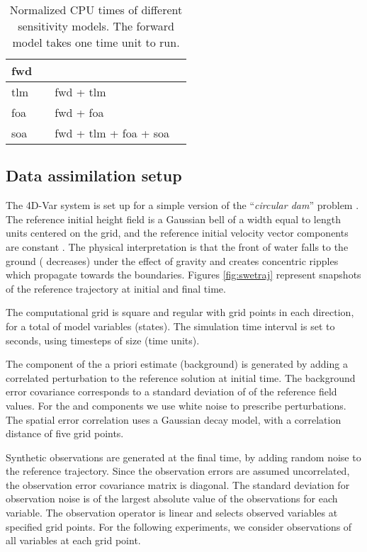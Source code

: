 \documentclass[final,sort&compress]{elsarticle}
\begin{document}
\begin{table}
\caption{Normalized CPU times of different sensitivity models. The forward model takes one time unit to run.}
\centering
\begin{tabular}{ll|ll}
\hline
  {\sc fwd} &  & & \\ \hline
  {\sc tlm} &  & {\sc fwd} + {\sc tlm} &  \\ \hline
  {\sc foa} &  & {\sc fwd} + {\sc foa} & \\ \hline
  {\sc soa} &  & {\sc fwd} + {\sc tlm} + {\sc foa} + {\sc soa} &  \\ \hline
\end{tabular}
\label{Table:CPUTimes_exp}
\end{table}


\subsection{Data assimilation setup}\label{sec:dasetup}

The 4D-Var system is set up for a simple version of the ``\textit{circular dam}'' problem \cite{anastasiou1997solution}.
The reference initial height field  is a Gaussian bell of a width equal to  length units centered on the grid, and 
the reference initial velocity vector components are constant . 
The physical interpretation is that the front of water falls to the ground ( decreases) under the effect of gravity
and creates concentric ripples which propagate towards the boundaries. 
Figures \ref{fig:swetraj} represent snapshots of the reference trajectory at initial and final time. 

The computational grid is square and regular with  grid points in each direction, for a total of  model variables (states).
The simulation time interval is set to  seconds, using  timesteps of size  (time units).

The  component of the a priori estimate (background)  is generated by adding a correlated perturbation to the  reference solution at initial time.
The background error covariance  corresponds to a standard deviation of  of the reference field values.
For the  and  components we use white noise to prescribe perturbations.
The spatial error correlation uses a Gaussian decay model, with a correlation distance of five grid points. 

Synthetic observations are generated at the final time, by adding random noise to the reference trajectory.
Since the observation errors are assumed uncorrelated, the observation error covariance matrix  is diagonal. 
The standard deviation for observation noise is  of the largest absolute value of the observations for each variable.
The observation operator  is linear and selects observed variables at specified grid points. 
For the following experiments, we consider observations of all variables at each grid point. 
\end{document}
